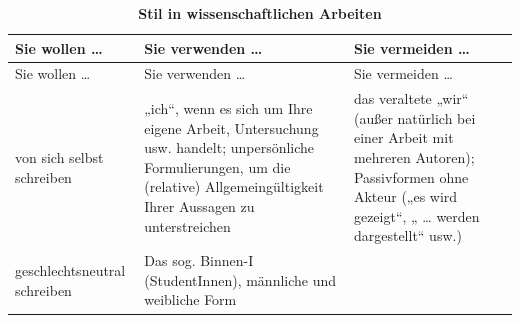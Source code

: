 \documentclass[]{book}
\theoremstyle{definition}
\theoremstyle{definition}
\theoremstyle{definition}
\theoremstyle{remark}
\begin{document}
\begin{longtable}[]{@{}lll@{}}
\caption{\textbf{\label{tab:stil} Stil in wissenschaftlichen
Arbeiten}}\tabularnewline
\toprule
\begin{minipage}[b]{0.11\columnwidth}\raggedright\strut
Sie wollen \ldots{}\strut
\end{minipage} & \begin{minipage}[b]{0.42\columnwidth}\raggedright\strut
Sie verwenden \ldots{}\strut
\end{minipage} & \begin{minipage}[b]{0.39\columnwidth}\raggedright\strut
Sie vermeiden \ldots{}\strut
\end{minipage}\tabularnewline
\midrule
\endfirsthead
\toprule
\begin{minipage}[b]{0.11\columnwidth}\raggedright\strut
Sie wollen \ldots{}\strut
\end{minipage} & \begin{minipage}[b]{0.42\columnwidth}\raggedright\strut
Sie verwenden \ldots{}\strut
\end{minipage} & \begin{minipage}[b]{0.39\columnwidth}\raggedright\strut
Sie vermeiden \ldots{}\strut
\end{minipage}\tabularnewline
\midrule
\endhead
\begin{minipage}[t]{0.11\columnwidth}\raggedright\strut
von sich selbst schreiben\strut
\end{minipage} & \begin{minipage}[t]{0.42\columnwidth}\raggedright\strut
„ich``, wenn es sich um Ihre eigene Arbeit, Untersuchung usw. handelt;
unpersönliche Formulierungen, um die (relative) Allgemeingültigkeit
Ihrer Aussagen zu unterstreichen \vspace{-6mm}\strut
\end{minipage} & \begin{minipage}[t]{0.39\columnwidth}\raggedright\strut
das veraltete „wir`` (außer natürlich bei einer Arbeit mit mehreren
Autoren); Passivformen ohne Akteur („es wird gezeigt``, „ \ldots{}
werden dargestellt`` usw.) \vspace{-6mm}\strut
\end{minipage}\tabularnewline
\begin{minipage}[t]{0.11\columnwidth}\raggedright\strut
geschlechtsneutral schreiben\strut
\end{minipage} & \begin{minipage}[t]{0.42\columnwidth}\raggedright\strut
Das sog. Binnen-I (StudentInnen), männliche und weibliche Form

\end{minipage}
\end{longtable}
\end{document}
